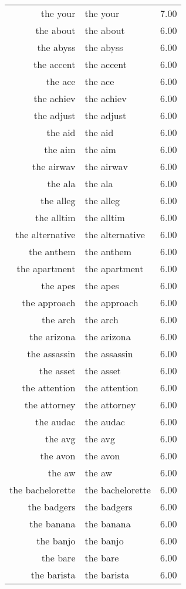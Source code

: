 \begin{table}[ht]
\begin{tabular}{rlr}
  the your & the your & 7.00 \\ 
  the about & the about & 6.00 \\ 
  the abyss & the abyss & 6.00 \\ 
  the accent & the accent & 6.00 \\ 
  the ace & the ace & 6.00 \\ 
  the achiev & the achiev & 6.00 \\ 
  the adjust & the adjust & 6.00 \\ 
  the aid & the aid & 6.00 \\ 
  the aim & the aim & 6.00 \\ 
  the airwav & the airwav & 6.00 \\ 
  the ala & the ala & 6.00 \\ 
  the alleg & the alleg & 6.00 \\ 
  the alltim & the alltim & 6.00 \\ 
  the alternative & the alternative & 6.00 \\ 
  the anthem & the anthem & 6.00 \\ 
  the apartment & the apartment & 6.00 \\ 
  the apes & the apes & 6.00 \\ 
  the approach & the approach & 6.00 \\ 
  the arch & the arch & 6.00 \\ 
  the arizona & the arizona & 6.00 \\ 
  the assassin & the assassin & 6.00 \\ 
  the asset & the asset & 6.00 \\ 
  the attention & the attention & 6.00 \\ 
  the attorney & the attorney & 6.00 \\ 
  the audac & the audac & 6.00 \\ 
  the avg & the avg & 6.00 \\ 
  the avon & the avon & 6.00 \\ 
  the aw & the aw & 6.00 \\ 
  the bachelorette & the bachelorette & 6.00 \\ 
  the badgers & the badgers & 6.00 \\ 
  the banana & the banana & 6.00 \\ 
  the banjo & the banjo & 6.00 \\ 
  the bare & the bare & 6.00 \\ 
  the barista & the barista & 6.00 \\ 

\end{tabular}
\end{table}

